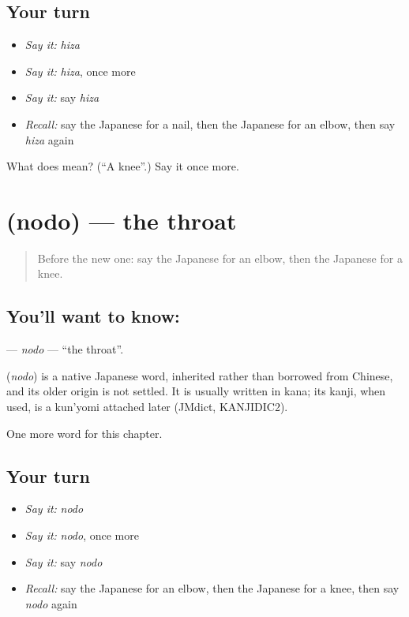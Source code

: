 \subsection*{Your turn}
\begin{itemize}
\raggedright
  \item \emph{Say it:} \emph{hiza}
  \item \emph{Say it:} \emph{hiza}, once more
  \item \emph{Say it:} say \emph{hiza}
  \item \emph{Recall:} say the Japanese for a nail, then the Japanese for an elbow, then say \emph{hiza} again
\end{itemize}

\begin{tcolorbox}[breakable,colback=teal!4,colframe=teal!35!black,title={Before you move on}]
What does  mean? (\textquotedblleft{}A knee\textquotedblright{}.) Say it once more.
\end{tcolorbox}
\section[\texorpdfstring{\ja{のど} (nodo)}{のど (nodo)}]{ (nodo) — the throat}

\label{lesson:JA-C20-nodo}



\begin{quote}
Before the new one: say the Japanese for an elbow, then the Japanese for a knee.
\end{quote}

\subsection*{You'll want to know: }
\textbf{} — \emph{nodo} — \textquotedblleft{}the throat\textquotedblright{}.

\begin{cousinweb}
\textbf{} (\emph{nodo}) is a native Japanese word, inherited rather than borrowed from Chinese, and its older origin is not settled. It is usually written in kana; its kanji, when used, is a kun'yomi attached later (JMdict, KANJIDIC2).
\end{cousinweb}

\begin{grammarlens}[title={What you've built}]
One more word for this chapter.
\end{grammarlens}

\subsection*{Your turn}
\begin{itemize}
\raggedright
  \item \emph{Say it:} \emph{nodo}
  \item \emph{Say it:} \emph{nodo}, once more
  \item \emph{Say it:} say \emph{nodo}
  \item \emph{Recall:} say the Japanese for an elbow, then the Japanese for a knee, then say \emph{nodo} again
\end{itemize}

